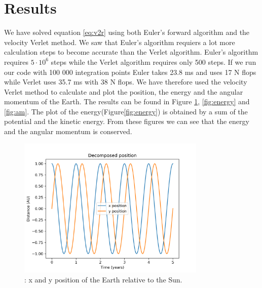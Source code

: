 \documentclass{article}
\begin{document}
\section{Results}
We have solved equation \ref{eq:v2r} using both Euler's forward algorithm and the velocity Verlet method. We saw that Euler's algorithm requiers a lot more calculation steps to become accurate than the Verlet algorithm. Euler's algorithm requires $5 \cdot 10^6$ steps while the Verlet algorithm requires only 500 steps. If we run our code with 100 000 integration points Euler takes 23.8 ms and uses 17 N flops while Verlet uses 35.7 ms with 38 N flops. We have therefore used the velocity Verlet method to calculate and plot the position, the energy and the angular momentum of the Earth. The results can be found in Figure \ref{fig:position}, \ref{fig:energy} and \ref{fig:am}. The plot of the energy(Figure\ref{fig:energy}) is obtained by a sum of the potential and the kinetic energy. From these figures we can see that the energy and the angular momentum is conserved.

\begin{figure}[H]
    \begin{center}
        \includegraphics[width=0.8\textwidth]{./Plot/xy_vs_time.png}
        \caption{: x and y position of the Earth relative to the Sun.}
        \label{fig:position}
    \end{center}
\end{figure}
\end{document}
